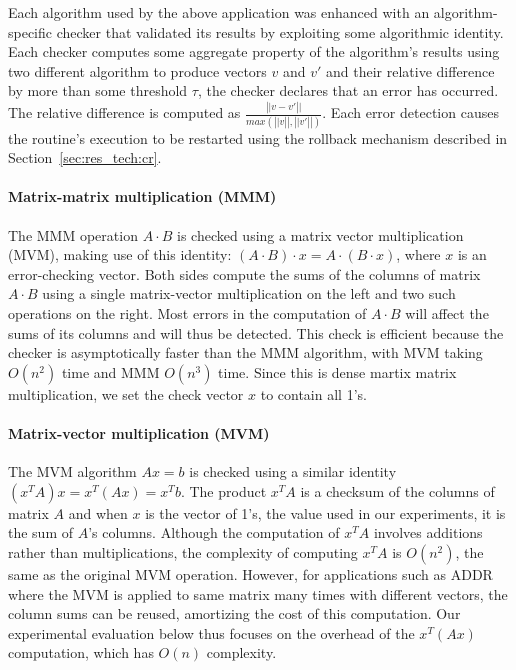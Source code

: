 \documentclass{sig-alternate}
\newcommand{\sui}[1]{%
  \textcolor{green}{SC - #1}
}
\begin{document}

Each algorithm used by the above application was enhanced with an algorithm-specific checker that validated its results by exploiting some algorithmic identity.
Each checker computes some aggregate property of the algorithm's results using two different algorithm to produce vectors $v$ and $v'$ and their relative difference by more than some threshold $\tau$, the checker declares that an error has occurred.
The relative difference is computed as $\frac{\left|| v-v' \right||}{max(\left||v\right||, \left||v'\right||)}$.
Each error detection causes the routine's execution to be restarted using the rollback mechanism described in Section~\ref{sec:res_tech:cr}.

\paragraph{Matrix-matrix multiplication (MMM)}
The MMM operation $A \cdot B$ is checked using a matrix vector multiplication (MVM), making use of this identity: $(A \cdot B) \cdot x = A \cdot (B \cdot x)$, where $x$ is an error-checking vector.
Both sides compute the sums of the columns of matrix $A \cdot B$ using a single matrix-vector multiplication on the left and two such operations on the right.
Most errors in the computation of $A \cdot B$ will affect the sums of its columns and will thus be detected.
This check is efficient because the checker is asymptotically faster than the MMM algorithm, with MVM taking $O(n^2)$ time and MMM $O(n^3)$ time.
Since this is dense martix matrix multiplication, we set the check vector $x$ to contain all 1's.

\paragraph{Matrix-vector multiplication (MVM)}
The MVM algorithm $Ax=b$ is checked using a similar identity $(x^TA)x = x^T(Ax) = x^Tb$.
The product $x^TA$ is a checksum of the columns of matrix $A$ and when $x$ is the vector of 1's, the value used in our experiments, it is the sum of $A$'s columns.
Although the computation of $x^TA$ involves additions rather than multiplications, the complexity of computing $x^TA$ is $O(n^2)$, the same as the original MVM operation.
However, for applications such as ADDR where the MVM is applied to same matrix many times with different vectors, the column sums can be reused, amortizing the cost of this computation.
Our experimental evaluation below thus focuses on the overhead of the $x^T(Ax)$ computation, which has $O(n)$ complexity.
\end{document}
